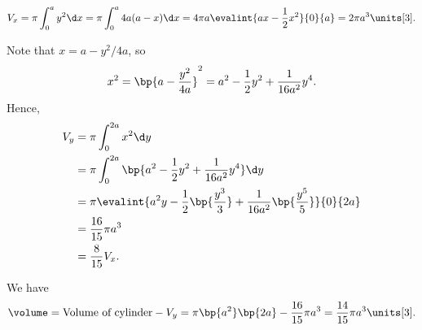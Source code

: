 \begin{solution}
    \[V_x = \pi \int_0^a y^2 \d x = \pi \int_0^a 4a(a-x) \d x = 4\pi a \evalint{ax - \frac12 x^2}{0}{a} = 2\pi a^3 \units[3].\]
    
    Note that $x = a - y^2/4a$, so \[x^2 = \bp{a - \frac{y^2}{4a}}^2 = a^2 - \frac12 y^2 + \frac1{16a^2}y^4.\] Hence, 
    \begin{align*}
        V_y &= \pi \int_0^{2a} x^2 \d y\\
        &= \pi \int_0^{2a} \bp{a^2 - \frac12 y^2 + \frac1{16a^2}y^4} \d y\\
        &= \pi \evalint{a^2y - \frac12 \bp{\frac{y^3}3} + \frac1{16a^2}\bp{\frac{y^5}5}}{0}{2a}\\
        &= \frac{16}{15} \pi a^3\\
        &= \frac8{15} V_x.
    \end{align*}

    We have \[\volume = \text{Volume of cylinder} - V_y = \pi\bp{a^2}\bp{2a} - \frac{16}{15} \pi a^3 = \frac{14}{15} \pi a^3 \units[3].\]
\end{solution}

